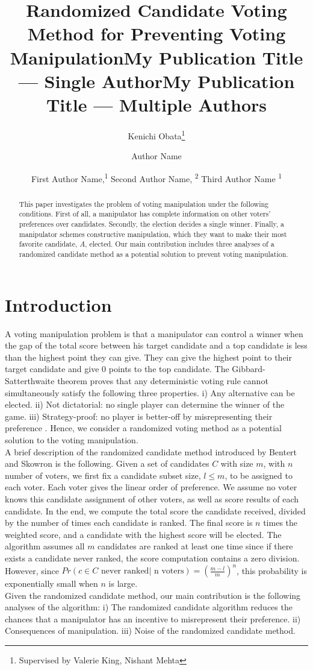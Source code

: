 \documentclass[letterpaper]{article} %
\title{Randomized Candidate Voting Method for Preventing Voting Manipulation}
\author{
    Kenichi Obata\thanks{Supervised by Valerie King, Nishant Mehta}
    \\
}
\title{My Publication Title --- Single Author}
\author {
    Author Name \\
}
\title{My Publication Title --- Multiple Authors}
\author {

        First Author Name,\textsuperscript{\rm 1}
        Second Author Name, \textsuperscript{\rm 2}
        Third Author Name \textsuperscript{\rm 1} \\
}
\begin{document}
\maketitle

\begin{abstract}
This paper investigates the problem of voting manipulation under the following conditions. First of all, a manipulator has complete information on other voters' preferences over candidates. Secondly, the election decides a single winner. Finally, a manipulator schemes constructive manipulation, which they want to make their most favorite candidate, $A$, elected. Our main contribution includes three analyses of a randomized candidate method as a potential solution to prevent voting manipulation.
\end{abstract}


\section{Introduction}
A voting manipulation problem is that a manipulator can control a winner when the gap of the total score between his target candidate and a top candidate is less than the highest point they can give. They can give the highest point to their target candidate and give $0$ points to the top candidate. The Gibbard-Satterthwaite theorem proves that any deterministic voting rule cannot simultaneously satisfy the following three properties. i) Any alternative can be elected. ii) Not dictatorial: no single player can determine the winner of the game. iii) Strategy-proof: no player is better-off by misrepresenting their preference \cite{Satterthwaite}. Hence, we consider a randomized voting method as a potential solution to the voting manipulation.\\
A brief description of the randomized candidate method introduced by Bentert and Skowron is the following. Given a set of candidates $C$ with size $m$, with $n$ number of voters, we first fix a candidate subset size, $l \le m$, to be assigned to each voter. Each voter gives the linear order of preference. We assume no voter knows this candidate assignment of other voters, as well as score results of each candidate. In the end, we compute the total score the candidate received, divided by the number of times each candidate is ranked. The final score is $n$ times the weighted score, and a candidate with the highest score will be elected. The algorithm assumes all $m$ candidates are ranked at least one time since if there exists a candidate never ranked, the score computation contains a zero division. However, since $Pr(c \in C \text{ never ranked}| \text{ n voters}) = (\frac{m-l}{m})^n$,  this probability is exponentially small when $n$ is large.\\
Given the randomized candidate method, our main contribution is the following analyses of the algorithm: i) The randomized candidate algorithm reduces the chances that a manipulator has an incentive to misrepresent their preference. ii) Consequences of manipulation. iii) Noise of the randomized candidate method. 
\end{document}
